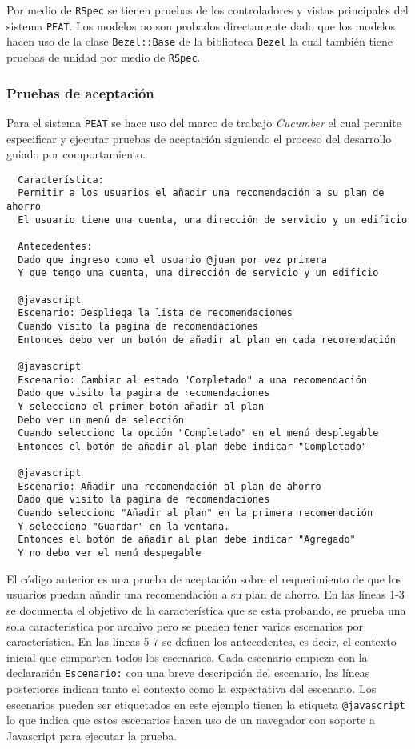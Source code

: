 Por medio de \texttt{RSpec} se tienen pruebas de los controladores y vistas
principales del sistema \texttt{PEAT}. Los modelos no son probados directamente
dado que los modelos hacen uso de la clase \texttt{Bezel::Base} de la biblioteca
\texttt{Bezel} la cual también tiene pruebas de unidad por medio de \texttt{RSpec}.

\subsubsection{Pruebas de aceptación}

Para el sistema \texttt{PEAT} se hace uso del marco de trabajo \textit{Cucumber}
el cual permite especificar y ejecutar pruebas de aceptación siguiendo el proceso
del desarrollo guiado por comportamiento.

\begin{lstlisting}
  Característica:
  Permitir a los usuarios el añadir una recomendación a su plan de ahorro
  El usuario tiene una cuenta, una dirección de servicio y un edificio

  Antecedentes:
  Dado que ingreso como el usuario @juan por vez primera
  Y que tengo una cuenta, una dirección de servicio y un edificio

  @javascript
  Escenario: Despliega la lista de recomendaciones
  Cuando visito la pagina de recomendaciones
  Entonces debo ver un botón de añadir al plan en cada recomendación

  @javascript
  Escenario: Cambiar al estado "Completado" a una recomendación
  Dado que visito la pagina de recomendaciones
  Y selecciono el primer botón añadir al plan
  Debo ver un menú de selección
  Cuando selecciono la opción "Completado" en el menú desplegable
  Entonces el botón de añadir al plan debe indicar "Completado"

  @javascript
  Escenario: Añadir una recomendación al plan de ahorro
  Dado que visito la pagina de recomendaciones
  Cuando selecciono "Añadir al plan" en la primera recomendación
  Y selecciono "Guardar" en la ventana.
  Entonces el botón de añadir al plan debe indicar "Agregado"
  Y no debo ver el menú despegable
\end{lstlisting}

El código anterior es una prueba de aceptación sobre el requerimiento de que los
usuarios puedan añadir una recomendación a su plan de ahorro.
En las líneas 1-3 se documenta el objetivo de la característica que se esta
probando, se prueba una sola característica por archivo pero se pueden tener
varios escenarios por característica. En las líneas 5-7 se definen
los antecedentes, es decir, el contexto inicial que comparten todos los
escenarios. Cada escenario empieza con la declaración \texttt{Escenario:}
con una breve descripción del escenario, las líneas posteriores indican
tanto el contexto como la expectativa del escenario. Los escenarios
pueden ser etiquetados en este ejemplo tienen la etiqueta \texttt{@javascript}
lo que indica que estos escenarios hacen uso de un navegador con soporte
a Javascript para ejecutar la prueba.

